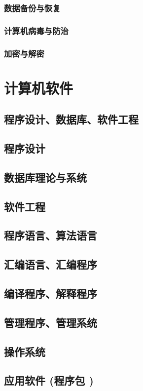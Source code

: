 \documentclass[UTF8]{../../ApplicationUniverse}
\begin{document}
        \subsubsection{数据备份与恢复}
        \subsubsection{计算机病毒与防治}
        \subsubsection{加密与解密}
\section{计算机软件}
    \subsection{程序设计、数据库、软件工程}
    \subsection{程序设计}
    \subsection{数据库理论与系统}
    \subsection{软件工程}
    \subsection{程序语言、算法语言}
    \subsection{汇编语言、汇编程序}
    \subsection{编译程序、解释程序}
    \subsection{管理程序、管理系统}
    \subsection{操作系统}
    \subsection{应用软件 (程序包 )}
\end{document}
